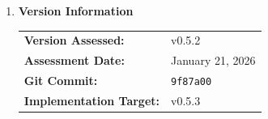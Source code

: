 \documentclass[11pt,letterpaper]{article}
\newcommand{\dmsection}[1]{\item \textbf{#1}\par}
\begin{document}
\begin{enumerate}
\textbf{If Fail:}
\begin{enumerate}
    \item Document failure details
    \item Fix blocking issues
    \item Re-run beta test
\end{enumerate}

\dmsection{Version Information}

\begin{tabular}{ll}
\textbf{Version Assessed:} & v0.5.2 \\
\textbf{Assessment Date:} & January 21, 2026 \\
\textbf{Git Commit:} & \texttt{9f87a00} \\
\textbf{Implementation Target:} & v0.5.3 \\
\end{tabular}

\end{enumerate}
\end{document}
